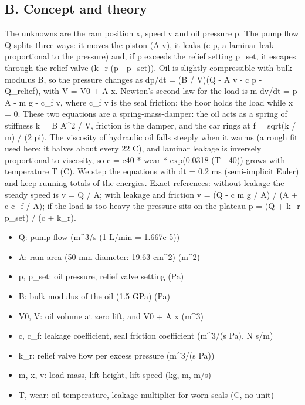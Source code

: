 \documentclass[11pt,a4paper]{article}
\begin{document}
\subsection*{B. Concept and theory}
The unknowns are the ram position x, speed v and oil pressure p. The pump flow Q splits three ways: it moves the piston (A v), it leaks (c p, a laminar leak proportional to the pressure) and, if p exceeds the relief setting p\_set, it escapes through the relief valve (k\_r (p - p\_set)). Oil is slightly compressible with bulk modulus B, so the pressure changes as dp/dt = (B / V)(Q - A v - c p - Q\_relief), with V = V0 + A x. Newton's second law for the load is m dv/dt = p A - m g - c\_f v, where c\_f v is the seal friction; the floor holds the load while x = 0. These two equations are a spring-mass-damper: the oil acts as a spring of stiffness k = B A\textasciicircum{}2 / V, friction is the damper, and the car rings at f = sqrt(k / m) / (2 pi). The viscosity of hydraulic oil falls steeply when it warms (a rough fit used here: it halves about every 22 C), and laminar leakage is inversely proportional to viscosity, so c = c40 * wear * exp(0.0318 (T - 40)) grows with temperature T (C). We step the equations with dt = 0.2 ms (semi-implicit Euler) and keep running totals of the energies. Exact references: without leakage the steady speed is v = Q / A; with leakage and friction v = (Q - c m g / A) / (A + c c\_f / A); if the load is too heavy the pressure sits on the plateau p = (Q + k\_r p\_set) / (c + k\_r).

\begin{itemize}[nosep]
\item Q: pump flow (m\textasciicircum{}3/s (1 L/min = 1.667e-5))
\item A: ram area (50 mm diameter: 19.63 cm\textasciicircum{}2) (m\textasciicircum{}2)
\item p, p\_set: oil pressure, relief valve setting (Pa)
\item B: bulk modulus of the oil (1.5 GPa) (Pa)
\item V0, V: oil volume at zero lift, and V0 + A x (m\textasciicircum{}3)
\item c, c\_f: leakage coefficient, seal friction coefficient (m\textasciicircum{}3/(s Pa), N s/m)
\item k\_r: relief valve flow per excess pressure (m\textasciicircum{}3/(s Pa))
\item m, x, v: load mass, lift height, lift speed (kg, m, m/s)
\item T, wear: oil temperature, leakage multiplier for worn seals (C, no unit)
\end{itemize}
\end{document}
